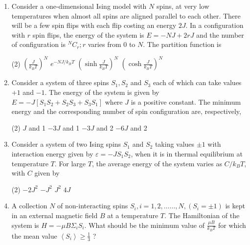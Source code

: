 \begin{enumerate}
\begin{tasks}
		\task[\textbf{b.}]Oscillates during evolution to equilibrium
		\task[\textbf{c.}]Is a maximum at equilibrium
		\task[\textbf{d.}]Is a minimum at equilibrium 
	\end{tasks}
\item 	Consider a one-dimensional Ising model with $N$ spins, at very low temperatures when almost all spins are aligned parallel to each other. There will be a few spin flips with each flip costing an energy $2 J$. In a configuration with $r$ spin flips, the energy of the system is $E=-N J+2 r J$ and the number of configuration is ${ }^{N} C_{r} ; r$ varies from 0 to $N$. The partition function is
{	}
	 \begin{tasks}(2)
		\task[\textbf{a.}] $\left(\frac{J}{k_{B} T}\right)^{N}$
		\task[\textbf{b.}]$e^{-N J / k_{B} T}$
		\task[\textbf{c.}] $\left(\sinh \frac{J}{k_{B} T}\right)^{N}$
		\task[\textbf{d.}] $\left(\cosh \frac{J}{k_{B} T}\right)^{N}$
	\end{tasks}
	\item Consider a system of three spins $S_{1}, S_{2}$ and $S_{3}$ each of which can take values $+1$ and $-1$. The energy of the system is given by $E=-J\left[S_{1} S_{2}+S_{2} S_{3}+S_{3} S_{1}\right]$ where $J$ is a positive constant. The minimum energy and the corresponding number of spin configuration are, respectively,
	{	}
	 \begin{tasks}(2)
		\task[\textbf{a.}]$J$ and 1
		\task[\textbf{b.}]$-3 J$ and 1
		\task[\textbf{c.}]$-3 J$ and 2
		\task[\textbf{d.}]  $-6 J$ and 2
	\end{tasks}
\item 	Consider a system of two Ising spins $S_{1}$ and $S_{2}$ taking values $\pm 1$ with interaction energy given by $\varepsilon=-J S_{1} S_{2}$, when it is in thermal equilibrium at temperature $T$. For large $T$, the average energy of the system varies as $C / k_{B} T$, with $C$ given by
{	}
	 \begin{tasks}(2)
		\task[\textbf{a.}]$-2 J^{2}$
		\task[\textbf{b.}] $-J^{2}$
		\task[\textbf{c.}]$J^{2}$
		\task[\textbf{d.}] $4 J$ 
	\end{tasks}
\item A collection $N$ of non-interacting spins $S_{i}, i=1,2, \ldots \ldots, N,\left(S_{i}=\pm 1\right)$ is kept in an external magnetic field $B$ at a temperature $T$. The Hamiltonian of the system is $H=-\mu B \Sigma_{i} S_{i}$. What should be the minimum value of $\frac{\mu B}{k_{B} T}$ for which the mean value $\left\langle S_{i}\right\rangle \geq \frac{1}{3}$ ?

\end{enumerate}
